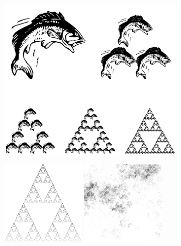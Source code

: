 \documentclass[10pt,a4paper,oneside]{article}
\theoremstyle{definition}
\begin{document}
\begin{figure}[b]
\begin{subfigure}[b]{0.3\textwidth}
   \includegraphics[width=\textwidth]{../img/sierpinski-evo.pdf}
    \caption{}
  \end{subfigure}
  \hspace{0.03\textwidth}
  \begin{subfigure}[b]{0.3\textwidth}
    \includegraphics[width=0.45\textwidth]{../img/sierpinski-off.png}
    \includegraphics[width=0.45\textwidth]{../img/random013.png} \\

\end{subfigure}
\end{figure}
\end{document}
